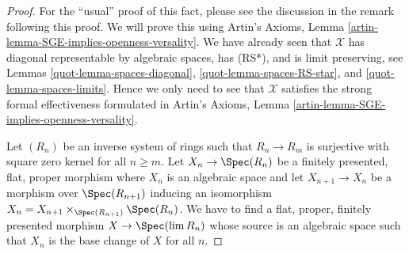 \begin{proof}

For the ``usual'' proof of this fact, please see the discussion
in the remark following this proof. We will prove this using
Artin's Axioms, Lemma \ref{artin-lemma-SGE-implies-openness-versality}.
We have already seen that $\mathcal{X}$ has diagonal
representable by algebraic spaces, has (RS*), and is limit preserving,
see Lemmas \ref{quot-lemma-spaces-diagonal},
\ref{quot-lemma-spaces-RS-star}, and
\ref{quot-lemma-spaces-limits}.
Hence we only need to see that $\mathcal{X}$ satisfies the strong
formal effectiveness formulated in
Artin's Axioms, Lemma \ref{artin-lemma-SGE-implies-openness-versality}.

\medskip\noindent
Let $(R_n)$ be an inverse system of rings such that
$R_n \to R_m$ is surjective with square zero kernel for
all $n \geq m$. Let $X_n \to \Spec(R_n)$ be a finitely presented,
flat, proper morphism where $X_n$ is an algebraic space and
let $X_{n + 1} \to X_n$ be a morphism over $\Spec(R_{n + 1})$
inducing an isomorphism $X_n = X_{n + 1} \times_{\Spec(R_{n + 1})} \Spec(R_n)$.
We have to find a flat, proper, finitely presented morphism
$X \to \Spec(\lim R_n)$ whose source is an algebraic space
such that $X_n$ is the base change of $X$ for all $n$.


\end{proof}
